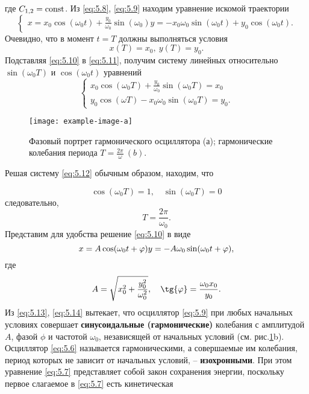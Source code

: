 где $C_{1,2}= \textrm{const}$. Из \eqref{eq:5.8}, \eqref{eq:5.9} находим уравнение искомой траектории
\begin{equation}
        \label{eq:5.10}
        \begin{cases}
                x=x_0 \cos(\omega_0t) + \frac{y_0}{\omega_0} \sin(\omega_0)
                y = -x_0\omega_0\sin(\omega_0t) + y_0\cos(\omega_0t). 
        \end{cases}
\end{equation}
Очевидно, что в момент $t=T$  должны выполняться условия
\begin{equation}
        \label{eq:5.11}
        x(T) = x_0, ~ y(T)=y_0.
\end{equation}
Подставляя \eqref{eq:5.10} в \eqref{eq:5.11}, получим систему линейных относительно $\sin(\omega_0 T)$ и $\cos(\omega_0t)$ уравнений
 \begin{equation}
        \label{eq:5.12}
        \begin{cases}
                x_0 \cos(\omega_0 T) + \frac{y_0}{\omega_0} \sin(\omega_0 T) = x_0\\
                y_0 \cos(\omega T) - x_0\omega_0 \sin(\omega_0 T) = y_0.
        \end{cases}
\end{equation}

\begin{figure}[h!]
        \centering
        \texttt{[image: example-image-a]}
        \caption{Фазовый портрет гармонического осциллятора (а); гармонические колебания периода
        $T =  \frac{2\pi}{\omega}~ (b)$.}
        \label{fig:5.2}
\end{figure}
Решая систему \eqref{eq:5.12} обычным образом, находим, что

\begin{equation}
        \label{eq:}
        \cos(\omega_0T) = 1, \quad \sin(\omega_0 T) =0
\end{equation}
следовательно,
\begin{equation}
        \label{eq:5.13}
        T= \frac{2\pi}{\omega_0}.
\end{equation}
Представим для удобства решение \eqref{eq:5.10} в виде
\begin{equation}
        \label{eq:5.14}
        x= A\cos(\omega_0 t+ \phi) \\
        y = -A\omega_0\sin(\omega_0t +\phi),
\end{equation}
где 
\begin{equation}
        \label{eq:}
        A= \sqrt{ x_0^2 + \frac{y_0^2}{\omega_0^2}}, \quad \tg{ \phi} = \frac{\omega_0x_0}{y_0}.
\end{equation}
Из \eqref{eq:5.13}, \eqref{eq:5.14} вытекает, что осциллятор \eqref{eq:5.9} при любых начальных условиях
совершает \textbf{ синусоидальные (гармонические) } колебания с амплитудой $A$, фазой $\phi$ и частотой $\omega_0$, независящей от начальных условий (см. рис.\ref{fig:5.2}b). Осциллятор \eqref{eq:5.6} называется гармоническими, а совершаемые им колебания, период которых не зависит от начальных условий, -- \textbf{ изохронными}.
При этом уравнение \eqref{eq:5.7} представляет собой закон сохранения энергии, поскольку первое слагаемое в \eqref{eq:5.7} есть кинетическая

